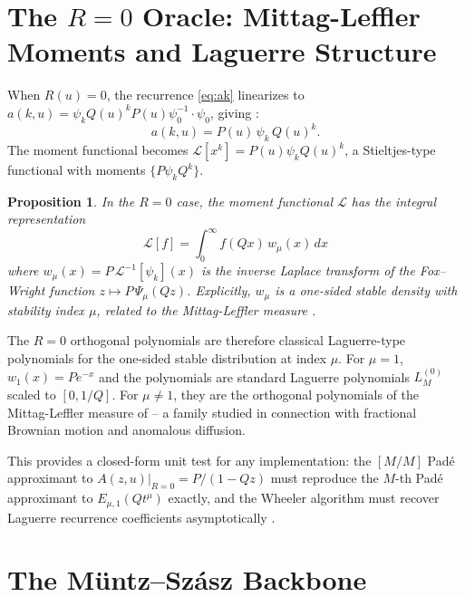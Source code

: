 \documentclass{article}
\newtheorem{proposition}{Proposition}
\begin{document}
\section{The $R = 0$ Oracle: Mittag-Leffler Moments and Laguerre Structure}

When $R(u) = 0$, the recurrence \eqref{eq:ak} linearizes to
$a(k,u) = \psi_k Q(u)^k P(u)\psi_0^{-1}\cdot\psi_0$, giving
\cite{Crowley2026}:
\begin{equation}\label{eq:r0_moments}
  a(k,u) = P(u)\,\psi_k\,Q(u)^k.
\end{equation}
The moment functional becomes $\mathcal{L}[x^k] = P(u)\psi_k Q(u)^k$, a
Stieltjes-type functional with moments $\{P\psi_k Q^k\}$.

\begin{proposition}
In the $R=0$ case, the moment functional $\mathcal{L}$ has the
integral representation
\begin{equation}\label{eq:r0_int}
  \mathcal{L}[f] = \int_0^\infty f(Qx)\,w_\mu(x)\,dx
\end{equation}
where $w_\mu(x) = P\,\mathcal{L}^{-1}[\psi_k](x)$ is the inverse Laplace
transform of the Fox--Wright function $z\mapsto P\,\Psi_\mu(Qz)$.
Explicitly, $w_\mu$ is a one-sided stable density with stability index $\mu$,
related to the Mittag-Leffler measure \cite{Grothaus2015}.
\end{proposition}

The $R=0$ orthogonal polynomials are therefore classical Laguerre-type
polynomials for the one-sided stable distribution at index $\mu$. For $\mu=1$,
$w_1(x) = P e^{-x}$ and the polynomials are standard Laguerre polynomials
$L_M^{(0)}$ scaled to $[0, 1/Q]$. For $\mu \ne 1$, they are the orthogonal
polynomials of the Mittag-Leffler measure of \cite{Grothaus2015} -- a family
studied in connection with fractional Brownian motion and anomalous diffusion.

This provides a closed-form unit test for any implementation: the $[M/M]$
Padé approximant to $A(z,u)|_{R=0} = P/(1-Qz)$ must reproduce the $M$-th
Padé approximant to $E_{\mu,1}(Qt^\mu)$ exactly, and the Wheeler algorithm
must recover Laguerre recurrence coefficients asymptotically \cite{Crowley2026}.

\section{The Müntz--Szász Backbone}
\end{document}
